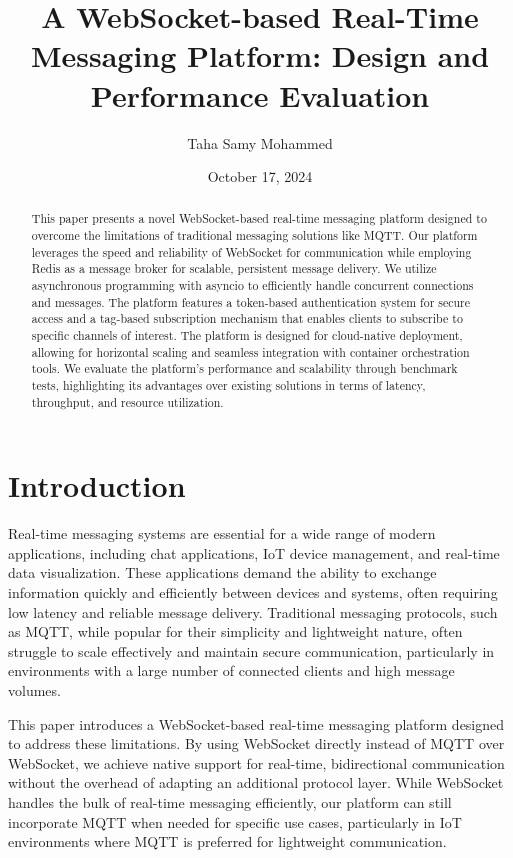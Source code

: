\documentclass[a4paper, 11pt]{article}
\title{A WebSocket-based Real-Time Messaging Platform: Design and Performance Evaluation}
\author{Taha Samy Mohammed}
\date{October 17, 2024}
\begin{document}
\maketitle

\begin{abstract}
This paper presents a novel WebSocket-based real-time messaging platform designed to overcome the limitations of traditional messaging solutions like MQTT. Our platform leverages the speed and reliability of WebSocket for communication while employing Redis as a message broker for scalable, persistent message delivery. We utilize asynchronous programming with asyncio to efficiently handle concurrent connections and messages. The platform features a token-based authentication system for secure access and a tag-based subscription mechanism that enables clients to subscribe to specific channels of interest. The platform is designed for cloud-native deployment, allowing for horizontal scaling and seamless integration with container orchestration tools. We evaluate the platform's performance and scalability through benchmark tests, highlighting its advantages over existing solutions in terms of latency, throughput, and resource utilization.
\end{abstract}

\section{Introduction}
Real-time messaging systems are essential for a wide range of modern applications, including chat applications, IoT device management, and real-time data visualization. These applications demand the ability to exchange information quickly and efficiently between devices and systems, often requiring low latency and reliable message delivery. Traditional messaging protocols, such as MQTT, while popular for their simplicity and lightweight nature, often struggle to scale effectively and maintain secure communication, particularly in environments with a large number of connected clients and high message volumes.

This paper introduces a WebSocket-based real-time messaging platform designed to address these limitations. By using WebSocket directly instead of MQTT over WebSocket, we achieve native support for real-time, bidirectional communication without the overhead of adapting an additional protocol layer. While WebSocket handles the bulk of real-time messaging efficiently, our platform can still incorporate MQTT when needed for specific use cases, particularly in IoT environments where MQTT is preferred for lightweight communication.
\end{document}
